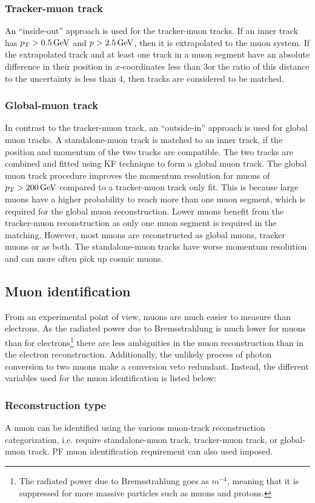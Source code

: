 \subsubsection*{Tracker-muon track}
\noindent\justify
An ``inside-out'' approach is used for the tracker-muon tracks. 
If an inner track has $p_{\mathrm{T}} > 0.5\,\text{Ge\hspace{-.08em}V}$ and $p > 2.5\,\text{Ge\hspace{-.08em}V}$, then it is extrapolated to the muon system. 
If the extrapolated track and at least one track in a muon segment have an absolute difference in their position in $x$-coordinates less than 3\cm or the ratio of this distance to the uncertainty is less than 4, then tracks are considered to be matched.  
\subsubsection*{Global-muon track}
\noindent\justify
In contrast to the tracker-muon track, an ``outside-in'' approach is used for global muon tracks. 
A standalone-muon track is matched to an inner track, if the position and momentum of the two tracks are compatible. 
The two tracks are combined and fitted using KF technique to form a global muon track. 
The global muon track procedure improves the momentum resolution for muons of $p_{\mathrm{T}} > 200\,\text{Ge\hspace{-.08em}V}$ compared to a tracker-muon track only fit. 
This is because large \pt muons have a higher probability to reach more than one muon segment, which is required for the global muon reconstruction. 
Lower \pt muons benefit from the tracker-muon reconstruction as only one muon segment is required in the matching. 
However, most muons are reconstructed as global muons, tracker muons or as both. The standalone-muon tracks have worse momentum resolution and can more often pick up cosmic muons. 
\subsection*{Muon identification}
\noindent\justify
From an experimental point of view, muons are much easier to measure than electrons. 
As the radiated power due to Bremsstrahlung is much lower for muons than for electrons\footnote{The radiated power due to Bremsstrahlung goes as $m^{-4}$, meaning that it is suppressed for more massive particles such as muons and protons.} there are less ambiguities in the muon reconstruction than in the electron reconstruction. 
Additionally, the unlikely process of photon conversion to two muons make a conversion veto redundant.   
Instead, the different variables used for the muon identification is listed below:
\subsubsection*{Reconstruction type}
\noindent\justify
 A muon can be identified using the various muon-track reconstruction categorization, i.e. require standalone-muon track, tracker-muon track, or global-muon track. 
PF muon identification requirement can also used imposed.
